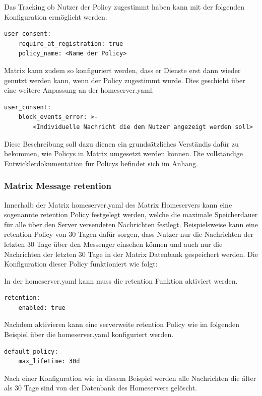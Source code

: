 Das Tracking ob Nutzer der Policy zugestimmt haben kann mit der folgenden Konfiguration ermöglicht werden.

\begin{lstlisting}
user_consent:
    require_at_registration: true
    policy_name: <Name der Policy>
\end{lstlisting}

Matrix kann zudem so konfiguriert werden, dass er Dienste erst dann wieder genutzt werden kann, wenn der Policy zugestimmt wurde.
Dies geschieht über eine weitere Anpassung an der homeserver.yaml.

\begin{lstlisting}
user_consent:
    block_events_error: >-
        <Individuelle Nachricht die dem Nutzer angezeigt werden soll>
\end{lstlisting}

Diese Beschreibung soll dazu dienen ein grundsätzliches Verständis dafür zu bekommen, wie Policys in Matrix umgesetzt werden können. Die vollständige Entwicklerdokumentation für Policys befindet sich im Anhang.

\subsubsection{Matrix Message retention}\label{chapter:vdmf}
Innerhalb der Matrix homeserver.yaml des Matrix Homeservers kann eine sogenannte retention Policy festgelegt werden, welche die maximale Speicherdauer für alle über den Server versendeten Nachrichten festlegt. Beispielsweise kann eine retention Policy von 30 Tagen dafür sorgen, dass Nutzer nur die Nachrichten der letzten 30 Tage über den Messenger einsehen können und auch nur die Nachrichten der letzten 30 Tage in der Matrix Datenbank gespeichert werden. Die Konfiguration dieser Policy funktioniert wie folgt:

In der homeserver.yaml kann muss die retention Funktion aktiviert werden.

\begin{lstlisting}
retention:
    enabled: true
\end{lstlisting}

Nachdem aktivieren kann eine serverweite retention Policy wie im folgenden Beispiel über die homeserver.yaml konfiguriert werden.

\begin{lstlisting}
default_policy:
    max_lifetime: 30d
\end{lstlisting}

Nach einer Konfiguration wie in diesem Beispiel werden alle Nachrichten die älter als 30 Tage sind von der Datenbank des Homeservers gelöscht.


